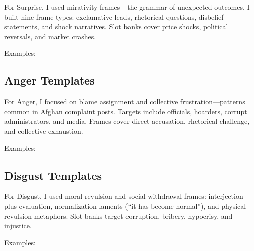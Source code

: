 \documentclass[11pt,a4paper]{article}
\newcommand{\dariit}[1]{\textit{\begin{persian}#1\end{persian}}}
\begin{document}
For Surprise, I used mirativity frames---the grammar of unexpected outcomes. I built nine frame types: exclamative leads, rhetorical questions, disbelief statements, and shock narratives. Slot banks cover price shocks, political reversals, and market crashes.

Examples:

\subsection{Anger Templates}

For Anger, I focused on blame assignment and collective frustration---patterns common in Afghan complaint posts. Targets include officials, hoarders, corrupt administrators, and media. Frames cover direct accusation, rhetorical challenge, and collective exhaustion.

Examples:

\subsection{Disgust Templates}

For Disgust, I used moral revulsion and social withdrawal frames: interjection plus evaluation, normalization laments (``it has become normal''), and physical-revulsion metaphors. Slot banks target corruption, bribery, hypocrisy, and injustice.

Examples:
\end{document}
